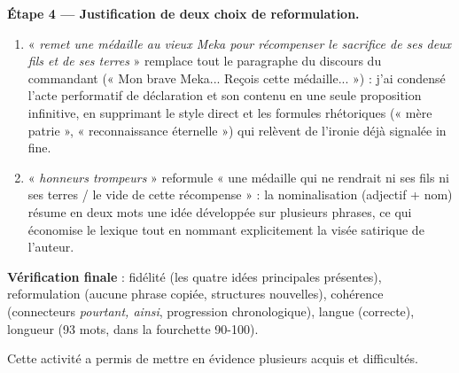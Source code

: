 \documentclass[11pt]{article}
\newcounter{popsec}
\newcounter{popsub}
\newcommand{\courssub}[1]{%
  \stepcounter{popsub}%
  \par\vspace{9pt}\noindent{\popxbold\fontsize{11.5}{13}\selectfont\color{popink}{\color{poporange}\thepopsec.\thepopsub}\hspace{6pt}#1}\par\nopagebreak\vspace{4pt}
}
\begin{document}
\begin{exoresolu}
\textbf{Étape 4 — Justification de deux choix de reformulation.}
\begin{enumerate}
\item « \emph{remet une médaille au vieux Meka pour récompenser le sacrifice de ses deux fils et de ses terres} » remplace tout le paragraphe du discours du commandant (« Mon brave Meka... Reçois cette médaille... ») : j'ai condensé l'acte performatif de déclaration et son contenu en une seule proposition infinitive, en supprimant le style direct et les formules rhétoriques (« mère patrie », « reconnaissance éternelle ») qui relèvent de l'ironie déjà signalée in fine.
\item « \emph{honneurs trompeurs} » reformule « une médaille qui ne rendrait ni ses fils ni ses terres / le vide de cette récompense » : la nominalisation (adjectif + nom) résume en deux mots une idée développée sur plusieurs phrases, ce qui économise le lexique tout en nommant explicitement la visée satirique de l'auteur.
\end{enumerate}

\textbf{Vérification finale} : fidélité (les quatre idées principales présentes), reformulation (aucune phrase copiée, structures nouvelles), cohérence (connecteurs \emph{pourtant, ainsi}, progression chronologique), langue (correcte), longueur (93 mots, dans la fourchette 90-100).
\end{exoresolu}

\courssub{Bilan de l'activité}

Cette activité a permis de mettre en évidence plusieurs acquis et difficultés.
\end{document}
